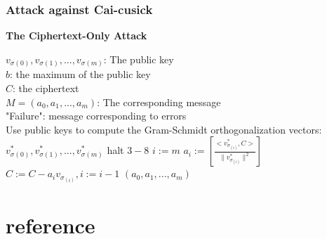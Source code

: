 \documentclass{beamer}
\begin{document}
	\subsubsection{Attack against Cai-cusick}
	\begin{algorithm}
		\caption{\textbf{The Ciphertext-Only Attack}}
		\begin{algorithmic}
			\REQUIRE 
			$v_{\sigma(0)},v_{\sigma(1)},...,v_{\sigma(m)}$: The public key\\
			$b$: the maximum of the public key\\
			$C$: the ciphertext\\
			\ENSURE
			$M=(a_0,a_1,...,a_m)$: The corresponding message\\
			"Failure": message corresponding to errors\\
			\STATE Use public keys to compute the Gram-Schmidt orthogonalization vectors:$v_{\sigma(0)}^\ast,v_{\sigma(1)}^\ast,...,v_{\sigma(m)}^\ast$
			\STATE halt
			{$3-8$}
			\ENDIF
			\STATE $i:=m$
			\REPEAT
			\STATE $a_i:=\left[\frac{<v_{\sigma_{(i)}}^\ast,C>}{\parallel v_{\sigma_{(i)}}^\ast\parallel^2} \right]$
			\STATE $C:=C-a_iv_{\sigma_{(i)}},i:=i-1$
			\RETURN $(a_0,a_1,...,a_m)$
		\end{algorithmic}	
	\end{algorithm}
\section*{reference}
\begin{frame}
	\printbibliography
\end{frame}
\end{document}
